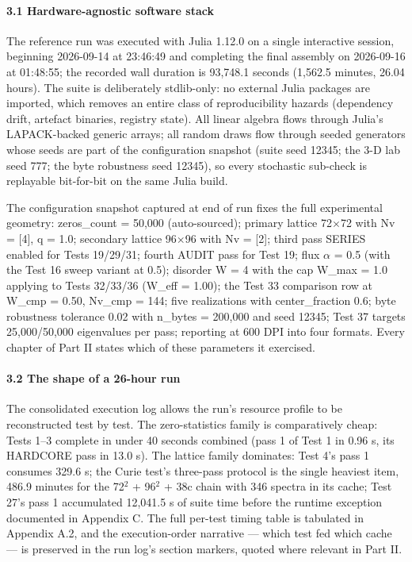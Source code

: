 \documentclass[10pt]{article}
\begin{document}
\paragraph{3.1 Hardware-agnostic software stack}

The reference run was executed with Julia 1.12.0 on a single interactive session, beginning 2026-09-14 at 23:46:49 and completing the final assembly on 2026-09-16 at 01:48:55; the recorded wall duration is 93,748.1 seconds (1,562.5 minutes, 26.04 hours). The suite is deliberately stdlib-only: no external Julia packages are imported, which removes an entire class of reproducibility hazards (dependency drift, artefact binaries, registry state). All linear algebra flows through Julia's LAPACK-backed generic arrays; all random draws flow through seeded generators whose seeds are part of the configuration snapshot (suite seed 12345; the 3-D lab seed 777; the byte robustness seed 12345), so every stochastic sub-check is replayable bit-for-bit on the same Julia build.

The configuration snapshot captured at end of run fixes the full experimental geometry: zeros\_count = 50,000 (auto-sourced); primary lattice 72$\times$72 with Nv = [4], q = 1.0; secondary lattice 96$\times$96 with Nv = [2]; third pass SERIES enabled for Tests 19/29/31; fourth AUDIT pass for Test 19; flux $\alpha$ = 0.5 (with the Test 16 sweep variant at 0.5); disorder W = 4 with the cap W\_max = 1.0 applying to Tests 32/33/36 (W\_eff = 1.00); the Test 33 comparison row at W\_cmp = 0.50, Nv\_cmp = 144; five realizations with center\_fraction 0.6; byte robustness tolerance 0.02 with n\_bytes = 200,000 and seed 12345; Test 37 targets 25,000/50,000 eigenvalues per pass; reporting at 600 DPI into four formats. Every chapter of Part II states which of these parameters it exercised.

\paragraph{3.2 The shape of a 26-hour run}

The consolidated execution log allows the run's resource profile to be reconstructed test by test. The zero-statistics family is comparatively cheap: Tests 1--3 complete in under 40 seconds combined (pass 1 of Test 1 in 0.96 s, its HARDCORE pass in 13.0 s). The lattice family dominates: Test 4's pass 1 consumes 329.6 s; the Curie test's three-pass protocol is the single heaviest item, 486.9 minutes for the 72$^2$ + 96$^2$ + 38c chain with 346 spectra in its cache; Test 27's pass 1 accumulated 12,041.5 s of suite time before the runtime exception documented in Appendix C. The full per-test timing table is tabulated in Appendix A.2, and the execution-order narrative --- which test fed which cache --- is preserved in the run log's section markers, quoted where relevant in Part II.
\end{document}
